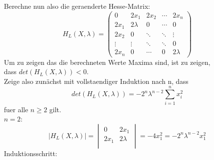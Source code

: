 \documentclass[11pt]{scrartcl}
\begin{document}
			Berechne nun also die geraenderte Hesse-Matrix:
			$$
			H_{L}(X,\lambda)=
			\left(
			\begin{array}{ccccc}
				0 & 2x_{1} & 2x_{2} & \cdots & 2x_{n} \\
				2x_{1} & 2\lambda & 0 & \cdots & 0 \\
				2x_{2} & 0 & \ddots & \ddots & \vdots \\
				\vdots & \vdots & \ddots & \ddots & 0 \\
				2x_{n} &  0 & \cdots & 0 & 2\lambda
			\end{array}
			\right)
			$$
			Um zu zeigen das die berechneten Werte Maxima sind, ist zu zeigen,\\ dass \(det(H_{L}(X,\lambda))<0\).\\
			Zeige also zunächst mit vollstaendiger Induktion nach n, dass
			$$
			det(H_{L}(X,\lambda))=-2^n\lambda^{n-2}\sum_{i=1}^{n}x_{i}^2
			$$
			fuer alle \(n\geq2\) gilt.\\
			\(n=2\):
			$$
			|H_{L}(X,\lambda)|=
			\begin{vmatrix}
				0 & 2x_{1} \\
				2x_{1} & 2\lambda\\
			\end{vmatrix}
			=-4x_{1}^2=-2^n\lambda^{n-2}x_{1}^2
			$$
			Induktionsschritt:
\end{document}
